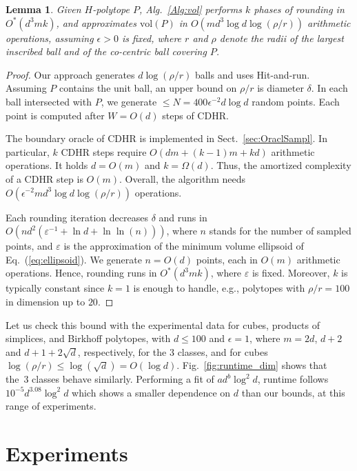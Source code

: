 \documentclass[11pt,a4paper]{article}
\newtheorem{lemma}[theorem]{\noindent Lemma}
\def\vol{\mbox{vol}}
\def\vol{\mbox{vol}}
\begin{document}
\begin{lemma}
Given $H$-polytope $P$, Alg.~\ref{Alg:vol}
performs $k$ phases of rounding in $O^*(d^3mk)$, and approximates $\vol(P)$
in $O(md^3\log d\log (\rho/r))$ arithmetic operations,
assuming $\epsilon>0$ is fixed,
where $r$ and $\rho$ denote the radii of the largest inscribed ball and
of the co-centric ball covering $P$.
\end{lemma}
\begin{proof}
Our approach generates $d\log (\rho/r)$ balls and uses Hit-and-run.
Assuming $P$ contains the unit ball, an upper bound on $\rho/r$
is diameter $\delta$. 
In each ball intersected with $P$, we generate
$\le N= 400\epsilon^{-2}d\log d$ random points.
Each point is computed after $W=O(d)$ steps of CDHR.

The boundary oracle of CDHR is implemented in Sect.~\ref{sec:OraclSampl}.
In particular, $k$ CDHR steps require $O(dm+(k-1)m+kd)$ arithmetic operations. 
It holds $d=O(m)$ and $k=\Omega(d)$.
Thus, the amortized complexity of a CDHR step is $O(m)$.
Overall, the algorithm needs
$O(\epsilon^{-2}md^3\log d\log(\rho/r))$ operations.

Each rounding iteration decreases $\delta$ and runs in
$O(nd^2(\varepsilon^{-1}+\ln d+\ln\ln(n)))$, where $n$ stands for the number
of sampled points, and $\varepsilon$ is the approximation of
the minimum volume ellipsoid of Eq.~(\ref{eq:ellipsoid}).
We generate $n=O(d)$ points, each in $O(m)$ arithmetic operations.
Hence, rounding runs in $O^*(d^3mk)$, where $\varepsilon$ is fixed.
Moreover, $k$ is typically constant since $k=1$ is enough to handle,
e.g., polytopes with $\rho/r=100$ in dimension up to $20$. 
\end{proof}

Let us check this bound with the
experimental data for cubes, products of simplices, and Birkhoff polytopes,
with $d\le 100$ and $\epsilon=1$, where
$m=2d$, $d+2$ and $d+1+2\sqrt{d}$, respectively, for the 3 classes, 
and for cubes $\log(\rho/r) \leq \log(\sqrt{d})=O(\log d)$.  
Fig.~\ref{fig:runtime_dim} shows that the~3 classes behave similarly.
Performing a fit of $ad^b\log^2 d$, runtime follows $10^{-5}d^{3.08}\log^2 d$
which shows a smaller dependence on $d$ than our bounds,
at this range of experiments.


\section{Experiments}\label{sec:exper}
\end{document}
